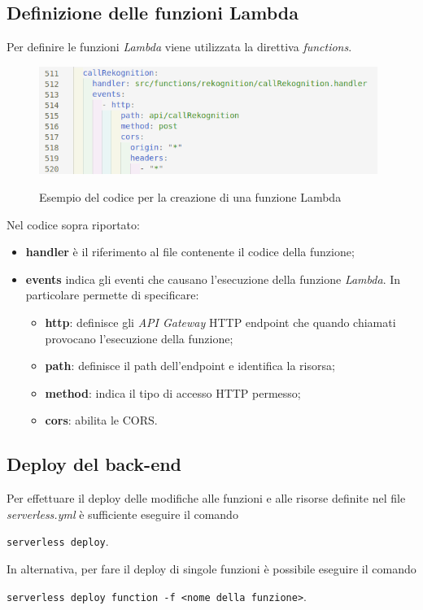 	\subsection{Definizione delle funzioni Lambda}
	Per definire le funzioni \emph{Lambda} viene utilizzata la direttiva \emph{functions}. 
	
	\begin{figure}[H]
		\centering
		\includegraphics[width=11cm]{immagini/lambda.png} \\
		\caption{\label{fig:lambda} Esempio del codice per la creazione di una funzione Lambda}
	\end{figure}

	Nel codice sopra riportato:
	\begin{itemize}
		\item \textbf{handler} è il riferimento al file contenente il codice della funzione; 
		\item \textbf{events} indica gli eventi che causano l'esecuzione della funzione \emph{Lambda}. In particolare permette di specificare:
		\begin{itemize}
			\item \textbf{http}: definisce gli \emph{API Gateway} HTTP endpoint che quando chiamati provocano l'esecuzione della funzione;
			\item \textbf{path}: definisce il path dell'endpoint e identifica la risorsa;
			\item \textbf{method}: indica il tipo di accesso HTTP permesso;
			\item \textbf{cors}: abilita le \gls{CORS}.
		\end{itemize}
		 
	\end{itemize}
	
	\subsection{Deploy del back-end}
	Per effettuare il \gls{deploy} delle modifiche alle funzioni e alle risorse definite nel file \emph{serverless.yml} è sufficiente eseguire il comando
	\begin{center}
		\texttt{serverless deploy}.
	\end{center} 
	In alternativa, per fare il \gls{deploy} di singole funzioni è possibile eseguire il comando 
	\begin{center}
		\texttt{serverless deploy function -f <nome della funzione>}.
	\end{center}

